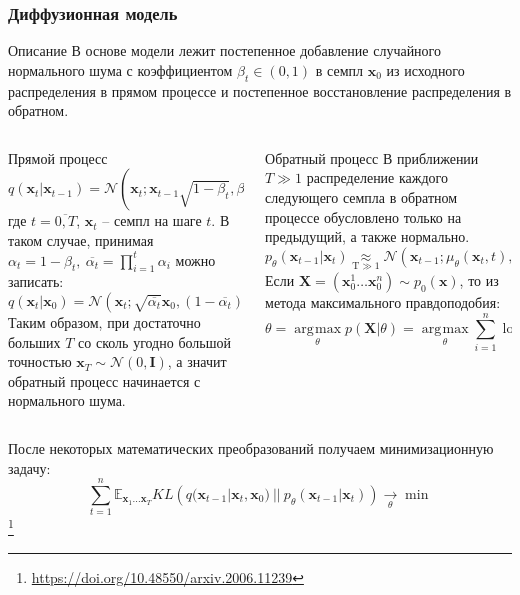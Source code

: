 \documentclass[8pt]{beamer}
\DeclareMathOperator*{\argmax}{\arg\!\max}
\newcommand\blfootnote[1]{%
	\begingroup
	\renewcommand\thefootnote{}\footnote{#1}%
	\addtocounter{footnote}{-1}%
	\endgroup
}
\begin{document}
\begin{frame}
		\frametitle{Диффузионная модель}
		\begin{block}{Описание}
		В основе модели лежит постепенное добавление случайного нормального шума с коэффициентом $\beta_t\in (0,1)$ в семпл $\textbf{x}_0$ из исходного распределения в прямом процессе и постепенное восстановление распределения в обратном. 
		\end{block}
	\begin{columns}
		
		\begin{column}{0.5\textwidth}
			\begin{block}{Прямой процесс}
				\begin{equation*}
					q(\textbf{x}_t|\textbf{x}_{t-1}) = \mathcal{N}(\textbf{x}_t; \textbf{x}_{t-1}\sqrt{1-\beta_t}, \beta_t 	\textbf{I})
				\end{equation*}
					где $t = \overline{0,T}$, $\textbf{x}_t$ -- семпл на шаге $t$.
				В таком случае, принимая $\alpha_t  = 1 - \beta_t,~\overline{\alpha_t} = \prod_{i=1}^t \alpha_i$ можно записать:
				\begin{equation*}
					q(\textbf {x}_t | \textbf{x}_0 ) = \mathcal{N} (\textbf{x}_t; \sqrt{\overline{\alpha_t}} \textbf{x}_0, (1-\overline{\alpha_t}) \textbf{I})
				\end{equation*}
				Таким образом, при достаточно больших $T$ со сколь угодно большой точностью $\textbf{x}_T\sim \mathcal{N}(0, \textbf{I})$, а значит обратный процесс начинается с нормального шума.				
			\end{block}  	 
	\end{column}

		\begin{column}{0.52\textwidth}
			\begin{block}{Обратный процесс}
				В приближении $T\gg 1$ распределение каждого следующего семпла в обратном процессе обусловлено только на предыдущий, а также нормально.
				\begin{equation*}
					p_\theta(\textbf{x}_{t-1}|\textbf{x}_t)\!\! \underset{\text{T} \gg 1}{ \approx}\!\!\! \mathcal{N}(\textbf{x}_{t-1};\mu_\theta(\textbf{x}_t,t), \Sigma_\theta(\textbf{x}_t, t))
				\end{equation*}
			Если $\textbf{X}  = (\textbf{x}_0^1\dots\textbf{x}_0^n)\sim p_0(\textbf{x})$, то из метода максимального правдоподобия:
			\begin{equation*}
				\theta =\argmax\limits_{\theta} p(\textbf{X}|\theta) = \argmax\limits_{\theta} \sum\limits_{i=1}^n \log{p(\textbf{x}_0^i|\theta)}
			\end{equation*}			
			\end{block}
		\end{column}
	\end{columns}
\medskip
После некоторых математических преобразований получаем минимизационную задачу:
 \begin{equation*}
	\sum\limits_{t=1}^n \mathbb{E}_{\textbf{x}_1\dots \textbf{x}_T} KL\left(q(\textbf{x}_{t-1}|\textbf{x}_t, \textbf{x}_0)~||~p_\theta(\textbf{x}_{t-1}|\textbf{x}_t)  \right) \xrightarrow[\theta]{}\min
\end{equation*}
\blfootnote{\url{https://doi.org/10.48550/arxiv.2006.11239}}


\end{frame}
\end{document}

